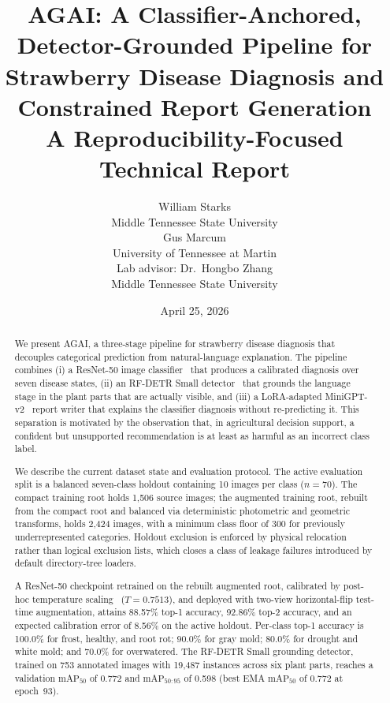 \documentclass[11pt]{article}
\title{AGAI: A Classifier-Anchored, Detector-Grounded Pipeline for Strawberry Disease Diagnosis and Constrained Report Generation\\[0.4em]
\large A Reproducibility-Focused Technical Report}
\author{
\begin{tabular}{c}
William Starks\\
Middle Tennessee State University\\[0.5em]
Gus Marcum\\
University of Tennessee at Martin\\[0.5em]
Lab advisor: Dr.\ Hongbo Zhang\\
Middle Tennessee State University
\end{tabular}
}
\date{April 25, 2026}
\begin{document}
\maketitle

\begin{abstract}
We present AGAI, a three-stage pipeline for strawberry disease diagnosis that decouples categorical prediction from natural-language explanation. The pipeline combines (i) a ResNet-50 image classifier~\citep{he2016resnet} that produces a calibrated diagnosis over seven disease states, (ii) an RF-DETR Small detector~\citep{robinson2025rfdetr,carion2020detr} that grounds the language stage in the plant parts that are actually visible, and (iii) a LoRA-adapted MiniGPT-v2~\citep{chen2023minigptv2,hu2021lora} report writer that explains the classifier diagnosis without re-predicting it. This separation is motivated by the observation that, in agricultural decision support, a confident but unsupported recommendation is at least as harmful as an incorrect class label.

We describe the current dataset state and evaluation protocol. The active evaluation split is a balanced seven-class holdout containing 10 images per class ($n{=}70$). The compact training root holds 1{,}506 source images; the augmented training root, rebuilt from the compact root and balanced via deterministic photometric and geometric transforms, holds 2{,}424 images, with a minimum class floor of 300 for previously underrepresented categories. Holdout exclusion is enforced by physical relocation rather than logical exclusion lists, which closes a class of leakage failures introduced by default directory-tree loaders.

A ResNet-50 checkpoint retrained on the rebuilt augmented root, calibrated by post-hoc temperature scaling~\citep{guo2017calibration} ($T = 0.7513$), and deployed with two-view horizontal-flip test-time augmentation, attains 88.57\% top-1 accuracy, 92.86\% top-2 accuracy, and an expected calibration error of 8.56\% on the active holdout. Per-class top-1 accuracy is 100.0\% for frost, healthy, and root rot; 90.0\% for gray mold; 80.0\% for drought and white mold; and 70.0\% for overwatered. The RF-DETR Small grounding detector, trained on 753 annotated images with 19{,}487 instances across six plant parts, reaches a validation $\mathrm{mAP}_{50}$ of 0.772 and $\mathrm{mAP}_{50:95}$ of 0.598 (best EMA $\mathrm{mAP}_{50}$ of 0.772 at epoch~93).


\end{abstract}
\end{document}
